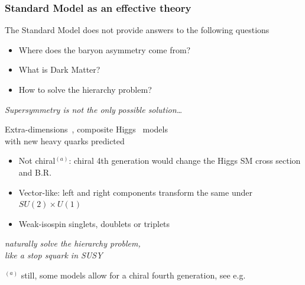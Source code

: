 \documentclass[xcolor=dvipsnames,10pt]{beamer}
\begin{document}
\begin{frame}\frametitle{Standard Model as an effective theory}
\scriptsize\centering

\myskip

The Standard Model does not provide answers to the following questions
\myskip
\begin{itemize}
\item Where does the baryon asymmetry come from?
\item What is Dark Matter?
\item How to solve the hierarchy problem?
\end{itemize}

\begin{flushright}\it Supersymmetry is not the only possible solution\dots\end{flushright}


Extra-dimensions~\cite{Csaki:2004ay}, composite Higgs~\cite{Perelstein:2005ka} models\\
with \alert{new heavy quarks predicted}~\cite{AguilarSaavedra:2009es}

\myskip

\begin{minipage}{.5\textwidth}

\begin{itemize}
\item Not chiral$^{(a)}$: chiral 4th generation would change the Higgs SM cross section and B.R.
\item Vector-like: left and right components transform the same under $SU(2)\times U(1)$
\item Weak-isospin singlets, doublets or triplets
\end{itemize}

\begin{flushright}\it naturally solve the  hierarchy problem,$\;\;$\\
like a stop squark in SUSY$\;\;$ \end{flushright}

\tiny
$^{(a)}$ still, some models allow for a chiral fourth generation, see e.g.~\cite{Cetin:2011aa}
\end{minipage}\begin{minipage}{.5\textwidth}\centering


\end{minipage}
\end{frame}
\end{document}

